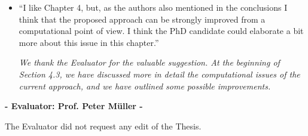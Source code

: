 \documentclass[11pt]{letter}
\begin{document}
\begin{itemize}
{\em 
	We thank the Evaluator for this question. We have clarified the spike detection procedure used in the simulation study by moving the discussion about the false discovery rate in that section. Moreover, we have added an analysis of the sensitivity of spike detection to the choice of the threshold (see page 41).
}
\vskip3mm

%
\item ``I like Chapter 4, but, as the authors also mentioned in the conclusions I think that the proposed approach can be strongly improved from a computational point of view. I think the PhD candidate could elaborate a bit more about this issue in this chapter.''\vskip1mm

{\em 
	We thank the Evaluator for the valuable suggestion. At the beginning of Section 4.3, we have discussed more in detail the computational issues of the current approach, and we have outlined some possible improvements.
}
\vskip3mm



\end{itemize}
\vskip10mm
\begin{center}
{\large\bf - Evaluator: Prof. Peter M\"uller -}
\end{center}

The Evaluator did not request any edit of the Thesis.

%
\end{document}
